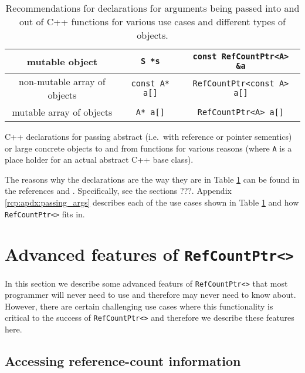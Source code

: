 \begin{table}
\begin{minipage}{{}\textwidth}
\begin{tabular}{|c|c|c|}
\hline
mutable object
& {}\texttt{S *s}
& {}\texttt{const RefCountPtr<A> \&a} \\
\hline
non-mutable array of objects
& {}\texttt{const A* a[]}
& {}\texttt{RefCountPtr<const A> a[]} \\
\hline
mutable array of objects
& {}\texttt{A* a[]}
& {}\texttt{RefCountPtr<A> a[]} \\
\hline
\end{tabular}
\begin{center}
C++ declarations for passing abstract (i.e.~with reference or pointer
sementics) or large concrete objects to and from functions for various
reasons (where {}\texttt{A} is a place holder for an actual abstract C++
base class).
\end{center}
\end{minipage}
%
\caption{\label{rcp:tbl:fnc-decl}
Recommendations for declarations for arguments being passed into and
out of C++ functions for various use cases and different types of
objects.}
%
\end{table}

The reasons why the declarations are the way they are in Table
{}\ref{rcp:tbl:fnc-decl} can be found in the references
{}\cite{ref:stroustrup_2000} and {}\cite{ref:meyers_1994}.
Specifically, see the sections ???.  Appendix
{}\ref{rcp:apdx:passing_args} describes each of the use cases shown in
Table {}{}\ref{rcp:tbl:fnc-decl} and how {}\texttt{RefCountPtr<>} fits
in.

%
\section{Advanced features of {}\texttt{RefCountPtr<>}}
%

In this section we describe some advanced featurs of
{}\texttt{RefCountPtr<>} that most programmer will never need to use and
therefore may never need to know about.  However, there are certain
challenging use cases where this functionality is critical to the
success of {}\texttt{RefCountPtr<>} and therefore we describe these
features here.

%
\subsection{Accessing reference-count information}
%

